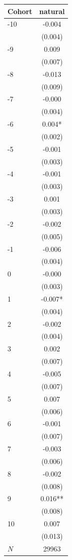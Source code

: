 {
\def\sym#1{\ifmmode^{#1}\else\(^{#1}\)\fi}
\begin{tabular}{l*{1}{c}}
\toprule
Cohort    &  natural   \\
\midrule
-10       &   -0.004   \\
          &  (0.004)   \\
-9        &    0.009   \\
          &  (0.007)   \\
-8        &   -0.013   \\
          &  (0.009)   \\
-7        &   -0.000   \\
          &  (0.004)   \\
-6        &    0.004*  \\
          &  (0.002)   \\
-5        &   -0.001   \\
          &  (0.003)   \\
-4        &   -0.001   \\
          &  (0.003)   \\
-3        &    0.001   \\
          &  (0.003)   \\
-2        &   -0.002   \\
          &  (0.005)   \\
-1        &   -0.006   \\
          &  (0.004)   \\
0         &   -0.000   \\
          &  (0.003)   \\
1         &   -0.007*  \\
          &  (0.004)   \\
2         &   -0.002   \\
          &  (0.004)   \\
3         &    0.002   \\
          &  (0.007)   \\
4         &   -0.005   \\
          &  (0.007)   \\
5         &    0.007   \\
          &  (0.006)   \\
6         &   -0.001   \\
          &  (0.007)   \\
7         &   -0.003   \\
          &  (0.006)   \\
8         &   -0.002   \\
          &  (0.008)   \\
9         &    0.016** \\
          &  (0.008)   \\
10        &    0.007   \\
          &  (0.013)   \\
\midrule
\(N\)     &    29963   \\
\bottomrule
\end{tabular}
}
